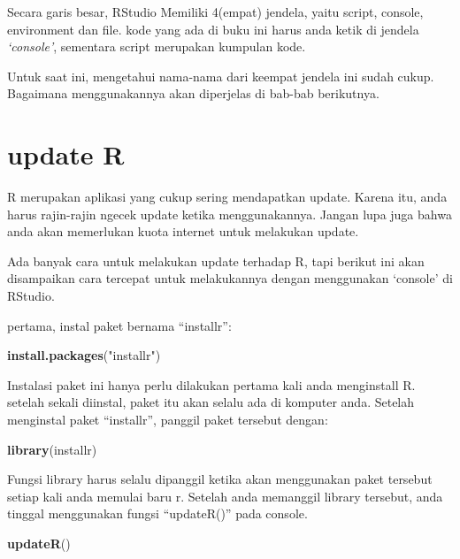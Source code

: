 \documentclass[
]{book}
\newenvironment{Shaded}{\begin{snugshade}}{\end{snugshade}}
\newcommand{\KeywordTok}[1]{\textcolor[rgb]{0.13,0.29,0.53}{\textbf{#1}}}
\newcommand{\NormalTok}[1]{#1}
\newcommand{\StringTok}[1]{\textcolor[rgb]{0.31,0.60,0.02}{#1}}
\begin{document}
Secara garis besar, RStudio Memiliki 4(empat) jendela, yaitu script, console, environment dan file. kode yang ada di buku ini harus anda ketik di jendela \emph{`console'}, sementara script merupakan kumpulan kode.

Untuk saat ini, mengetahui nama-nama dari keempat jendela ini sudah cukup. Bagaimana menggunakannya akan diperjelas di bab-bab berikutnya.

\hypertarget{update-r}{%
\section{update R}\label{update-r}}

R merupakan aplikasi yang cukup sering mendapatkan update. Karena itu, anda harus rajin-rajin ngecek update ketika menggunakannya. Jangan lupa juga bahwa anda akan memerlukan kuota internet untuk melakukan update.

Ada banyak cara untuk melakukan update terhadap R, tapi berikut ini akan disampaikan cara tercepat untuk melakukannya dengan menggunakan `console' di RStudio.

pertama, instal paket bernama ``installr'':

\begin{Shaded}
\begin{Highlighting}[]
\KeywordTok{install.packages}\NormalTok{(}\StringTok{"installr"}\NormalTok{)}
\end{Highlighting}
\end{Shaded}

Instalasi paket ini hanya perlu dilakukan pertama kali anda menginstall R. setelah sekali diinstal, paket itu akan selalu ada di komputer anda. Setelah menginstal paket ``installr'', panggil paket tersebut dengan:

\begin{Shaded}
\begin{Highlighting}[]
\KeywordTok{library}\NormalTok{(installr)}
\end{Highlighting}
\end{Shaded}

Fungsi library harus selalu dipanggil ketika akan menggunakan paket tersebut setiap kali anda memulai baru r. Setelah anda memanggil library tersebut, anda tinggal menggunakan fungsi ``updateR()'' pada console.

\begin{Shaded}
\begin{Highlighting}[]
\KeywordTok{updateR}\NormalTok{()}
\end{Highlighting}
\end{Shaded}
\end{document}
